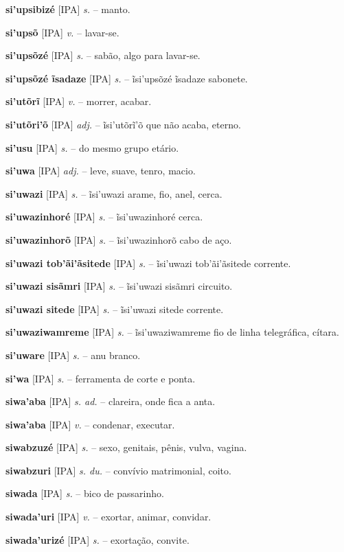 \textbf{si'upsibizé} [IPA] \textit{s.} -- manto.

\textbf{si'upsõ} [IPA] \textit{v.} -- lavar-se.

\textbf{si'upsõzé} [IPA] \textit{s.} -- sabão, algo para lavar-se.

\textbf{si'upsõzé ĩsadaze} [IPA] \textit{s.} -- ĩsi'upsõzé ĩsadaze sabonete.

\textbf{si'utõrĩ} [IPA] \textit{v.} -- morrer, acabar.

\textbf{si'utõri'õ} [IPA] \textit{adj.} -- ĩsi'utõrĩ'õ que não acaba, eterno.

\textbf{si'usu} [IPA] \textit{s.} -- do mesmo grupo etário.

\textbf{si'uwa} [IPA] \textit{adj.} -- leve, suave, tenro, macio.

\textbf{si'uwazi} [IPA] \textit{s.} -- ĩsi'uwazi arame, fio, anel, cerca.

\textbf{si'uwazinhoré} [IPA] \textit{s.} -- ĩsi'uwazinhoré cerca.

\textbf{si'uwazinhorõ} [IPA] \textit{s.} -- ĩsi'uwazinhorõ cabo de aço.

\textbf{si'uwazi tob'ãi'ãsitede} [IPA] \textit{s.} -- ĩsi'uwazi tob'ãi'ãsitede corrente.

\textbf{si'uwazi sisãmri} [IPA] \textit{s.} -- ĩsi'uwazi sisãmri circuito.

\textbf{si'uwazi sitede} [IPA] \textit{s.} -- ĩsi'uwazi sitede corrente.

\textbf{si'uwaziwamreme} [IPA] \textit{s.} -- ĩsi'uwaziwamreme fio de linha telegráfica, cítara.

\textbf{si'uware} [IPA] \textit{s.} -- anu branco.

\textbf{si'wa} [IPA] \textit{s.} -- ferramenta de corte e ponta.

\textbf{siwa'aba} [IPA] \textit{s. ad.} -- clareira, onde fica a anta.

\textbf{siwa'aba} [IPA] \textit{v.} -- condenar, executar.

\textbf{siwabzuzé} [IPA] \textit{s.} -- sexo, genitais, pênis, vulva, vagina.

\textbf{siwabzuri} [IPA] \textit{s. du.} -- convívio matrimonial, coito.

\textbf{siwada} [IPA] \textit{s.} -- bico de passarinho.

\textbf{siwada'uri} [IPA] \textit{v.} -- exortar, animar, convidar.

\textbf{siwada'urizé} [IPA] \textit{s.} -- exortação, convite.

